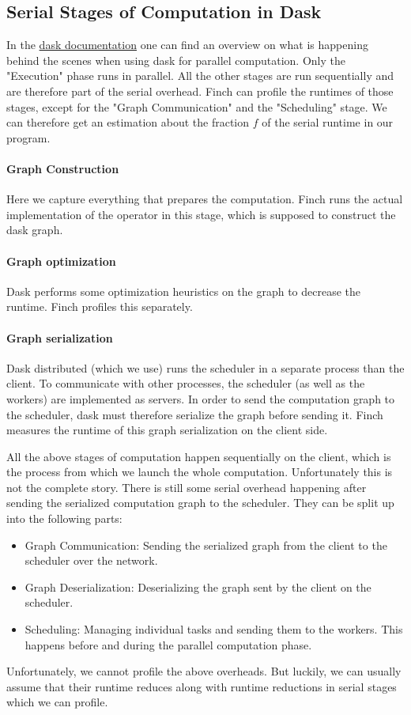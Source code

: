 \subsection{Serial Stages of Computation in Dask}

In the \href{https://docs.dask.org/en/stable/phases-of-computation.html}{dask documentation} one can find an overview on what is happening behind the scenes when using dask for parallel computation.
Only the "Execution" phase runs in parallel.
All the other stages are run sequentially and are therefore part of the serial overhead.
Finch can profile the runtimes of those stages, except for the "Graph Communication" and the "Scheduling" stage.
We can therefore get an estimation about the fraction $f$ of the serial runtime in our program.

\paragraph{Graph Construction}
Here we capture everything that prepares the computation.
Finch runs the actual implementation of the operator in this stage, which is supposed to construct the dask graph.

\paragraph{Graph optimization}
Dask performs some optimization heuristics on the graph to decrease the runtime.
Finch profiles this separately.

\paragraph{Graph serialization}
Dask distributed (which we use) runs the scheduler in a separate process than the client.
To communicate with other processes, the scheduler (as well as the workers) are implemented as servers.
In order to send the computation graph to the scheduler, dask must therefore serialize the graph before sending it.
Finch measures the runtime of this graph serialization on the client side.

All the above stages of computation happen sequentially on the client, which is the process from which we launch the whole computation.
Unfortunately this is not the complete story.
There is still some serial overhead happening after sending the serialized computation graph to the scheduler.
They can be split up into the following parts:
\begin{itemize}
    \item Graph Communication: Sending the serialized graph from the client to the scheduler over the network.
    \item Graph Deserialization: Deserializing the graph sent by the client on the scheduler.
    \item Scheduling: Managing individual tasks and sending them to the workers. This happens before and during the parallel computation phase.
\end{itemize}

Unfortunately, we cannot profile the above overheads.
But luckily, we can usually assume that their runtime reduces along with runtime reductions in serial stages which we can profile.